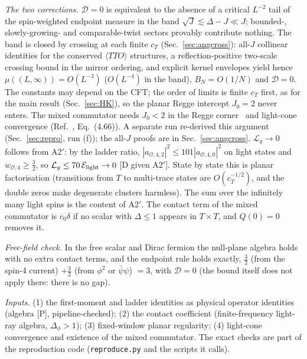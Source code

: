 \documentclass[aps,prl,onecolumn,superscriptaddress,nofootinbib]{revtex4-2}
\begin{document}
\emph{The two corrections.} $\mathcal D=0$ is equivalent to the absence of a critical $L^{-2}$ tail of the spin-weighted endpoint
measure in the band $\sqrt J\lesssim\Delta-J\ll J$; bounded-, slowly-growing- and comparable-twist sectors provably contribute nothing.
The band is closed by crossing at each finite $c_T$ (Sec.~\ref{sec:angcross}): all-$J$ collinear identities for the conserved
$\langle TTO\rangle$ structures, a reflection-positive two-scale crossing bound in the mirror ordering, and explicit kernel envelopes yield
hence $\mu((L,\infty))=O(L^{-3})$ ($O(L^{-4})$ in the band), $B_N=O(1/N)$ and $\mathcal D=0$. The constants may depend on the CFT;
the order of limits is finite $c_T$ first, as for the main result (Sec.~\ref{sec:HK}), so the planar Regge intercept $J_0=2$ never
enters. The mixed commutator needs $J_0<2$ in the Regge corner~\cite{KKSDZ} and light-cone convergence (Ref.~\cite{KKSDZ},
Eq.~(4.66)). A separate run re-derived this argument (Sec.~\ref{sec:repro}, run (f)); the all-$J$ proofs are in Sec.~\ref{sec:angcross}. $\mathcal L_g\to0$ follows from
A2$'$: by the ladder ratio, $|a_{\mathcal O,4,2}|^2\le101|a_{\mathcal O,4,0}|^2$ on light states and $w_{\mathcal O,4}\ge\tfrac32$, so
$\mathcal L_g\le70\,\mathcal E_{\rm light}\to0$ [D given A2$'$]. State by state this is planar factorisation (transitions from $T$ to
multi-trace states are $O(c_T^{-1/2})$, and the double zeros make degenerate clusters harmless). The sum over the infinitely many
light spins is the content of A2$'$. The contact term of the mixed commutator is $c_0\delta$ if no scalar with
$\Delta\le1$ appears in $T\times T$, and $Q(0)=0$ removes it.

\emph{Free-field check.} In the free scalar and Dirac fermion the null-plane algebra holds with no extra contact terms, and the
endpoint rule holds exactly, $\frac32$ (from the spin-4 current) $+\frac32$ (from $\phi^2$ or $\bar\psi\psi$) $=3$, with $\mathcal D=0$
(the bound itself does not apply there: there is no gap).

\emph{Inputs.} (1) the first-moment and ladder identities as physical operator identities (algebra [P], pipeline-checked); (2) the
contact coefficient (finite-frequency light-ray algebra, $\Delta_\phi>1$); (3) fixed-window planar regularity; (4) light-cone
convergence and existence of the mixed commutator. The exact checks are part of the reproduction code (\texttt{reproduce.py} and the scripts it calls).
\end{document}

